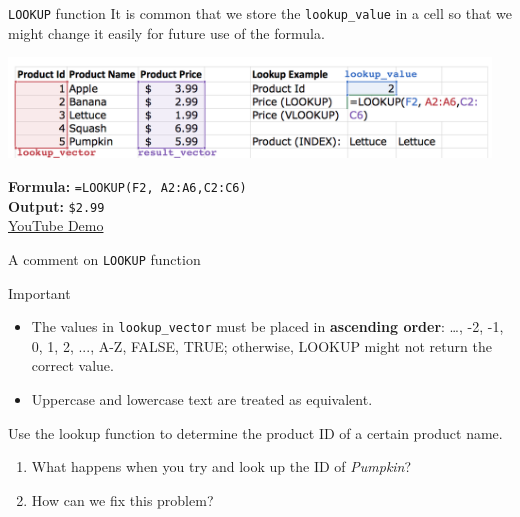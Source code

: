 \documentclass[xcolor=svgnames]{beamer}
\newcommand{\blue}[1]{{\textcolor{blue}{#1}}}
\begin{document}
\begin{frame}[fragile]{\texttt{LOOKUP} function}
It is common that we store the {\tt lookup\_value} in a cell so that we might change it easily for future use of the formula.
\begin{center}
 \includegraphics[width=0.96\textwidth]{lookupZoom}
\end{center}
{\bf Formula:} {\tt =LOOKUP(F2, A2:A6,C2:C6)}\\
{\bf Output:} {\tt \$2.99}\\
\href{https://youtu.be/jvcK_nbxCZM}{YouTube Demo}
\end{frame}


\begin{frame}[fragile]{A comment on \texttt{LOOKUP} function}
\begin{alertblock}{Important}
\begin{itemize}
\item The values in {\tt lookup\_vector} must be placed in {\bf ascending order}: \dots, -2, -1, 0, 1, 2, ..., A-Z, FALSE, TRUE; 
otherwise, LOOKUP might not return the correct value. 
\item Uppercase and lowercase text are treated as equivalent.
\end{itemize}
\end{alertblock}
\begin{example}
Use the lookup function to determine the product ID of a certain product name.
\begin{enumerate}
\item What happens when you try and look up the ID of \textit{Pumpkin}?  
\item How can we fix this problem?
\end{enumerate}
\end{example}

\end{frame}
\end{document}

